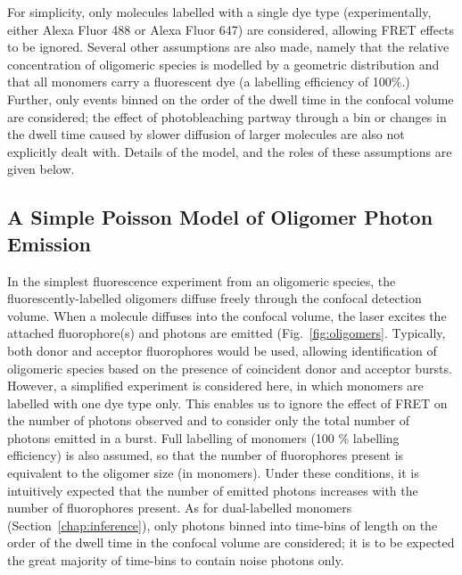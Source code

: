 For simplicity, only molecules labelled with a single dye type (experimentally, either Alexa Fluor 488 or Alexa Fluor 647) are considered, allowing FRET effects to be ignored. Several other assumptions are also made, namely that the relative concentration of oligomeric species is modelled by a geometric distribution and that all monomers carry a fluorescent dye (a labelling efficiency of 100\%.) Further, only events binned on the order of the dwell time in the confocal volume are considered; the effect of photobleaching partway through a bin or changes in the dwell time caused by slower diffusion of larger molecules are also not explicitly dealt with. Details of the model, and the roles of these assumptions are given below.

\subsection{A Simple Poisson Model of Oligomer Photon Emission}
In the simplest fluorescence experiment from an oligomeric species, the fluorescently-labelled oligomers diffuse freely through the confocal detection volume.  When a molecule diffuses into the confocal volume, the laser excites the attached fluorophore(s) and photons are emitted (Fig.~\ref{fig:oligomers}. Typically, both donor and acceptor fluorophores would be used, allowing identification of oligomeric species based on the presence of coincident donor and acceptor bursts. However, a simplified experiment is considered here, in which monomers are labelled with one dye type only. This enables us to ignore the effect of FRET on the number of photons observed and to consider only the total number of photons emitted in a burst. Full labelling of monomers (100 \% labelling efficiency) is also assumed, so that the number of fluorophores present is equivalent to the oligomer size (in monomers). Under these conditions, it is intuitively expected that the number of emitted photons increases with the number of fluorophores present. As for dual-labelled monomers (Section~\ref{chap:inference}), only photons binned into time-bins of length on the order of the dwell time in the confocal volume are considered; it is to be expected the great majority of time-bins to contain noise photons only.

